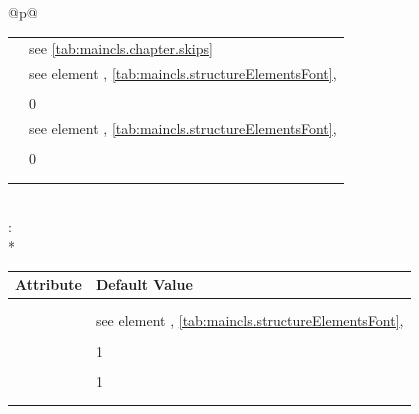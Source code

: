 \begin{longtable}{@{}p{\columnwidth}@{}}
\begin{tabularx}{\linewidth}{ll}
    \PValue{beforeskip}  & see \autoref{tab:maincls.chapter.skips} \\
    \PValue{font}        & see element \DescRef{maincls.fontelement.chapter},
                           \autoref{tab:maincls.structureElementsFont},
                           \autopageref{tab:maincls.structureElementsFont} \\
    \PValue{innerskip}   & \PValue{0.5\Length{baselineskip}} \\
    \PValue{level}       & 0 \\
    \PValue{prefixfont}  & see element
                           \DescRef{maincls.fontelement.chapterprefix},
                           \autoref{tab:maincls.structureElementsFont},
                           \autopageref{tab:maincls.structureElementsFont} \\
    \PValue{tocindent}   & \PValue{0pt} \\
    \PValue{toclevel}    & 0 \\
    \PValue{tocnumwidth} & \PValue{1.5em} \\
    \PValue{tocstyle}    & \PValue{chapter} \\
    \bottomrule
    \end{tabularx} \\
    \addlinespace[\normalbaselineskip]
    : \\*
    \begin{tabularx}{\linewidth}{ll}
    \toprule
    Attribute & Default Value \\
    \midrule
    \PValue{afterskip}   & \PValue{2.3ex plus .2ex} \\
    \PValue{beforeskip}  & \PValue{-3.5ex plus -1ex minus -.2ex} \\
    \PValue{font}        & see element \DescRef{maincls.fontelement.section},
                           \autoref{tab:maincls.structureElementsFont},
                           \autopageref{tab:maincls.structureElementsFont} \\
    \PValue{indent}      & \PValue{0pt} \\
    \PValue{level}       & 1 \\
    \PValue{tocindent}   & \PValue{1.5em}\\
    \PValue{toclevel}    & 1 \\
    \PValue{tocnumwidth} & \PValue{2.3em}\\
    \PValue{tocstyle}    & \PValue{section} \\
    \bottomrule
    \end{tabularx} \\

\end{longtable}
